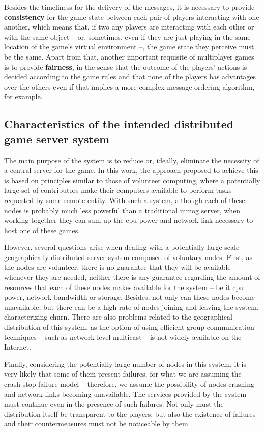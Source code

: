 \documentclass[]{usiinfprospectus}
\begin{document}
Besides the timeliness for the delivery of the messages, it is necessary to provide \textbf{consistency} for the game state between each pair of players interacting with one another, which means that, if two any players are interacting with each other or with the same object -- or, sometimes, even if they are just playing in the same location of the game's virtual environment --, the game state they perceive must be the same. Apart from that, another important requisite of multiplayer games is to provide \textbf{fairness}, in the sense that the outcome of the players' actions is decided according to the game rules and that none of the players has advantages over the others even if that implies a more complex message ordering algorithm, for example.


\subsection{Characteristics of the intended distributed game server system} \label{sec:feats}

The main purpose of the system is to reduce or, ideally, eliminate the necessity of a central server for the game. In this work, the approach proposed to achieve this is based on principles similar to those of volunteer computing, where a potentially large set of contributors make their computers available to perform tasks requested by some remote entity. With such a system, although each of these nodes is probably much less powerful than a traditional mmog server, when working together they can sum up the cpu power and network link necessary to host one of these games.

However, several questions arise when dealing with a potentially large scale geographically distributed server system composed of voluntary nodes. First, as the nodes are volunteer, there is no guarantee that they will be available whenever they are needed, neither there is any guarantee regarding the amount of resources that each of these nodes makes available for the system -- be it cpu power, network bandwidth or storage. Besides, not only can these nodes become unavailable, but there can be a high rate of nodes joining and leaving the system, characterizing churn. There are also problems related to the geographical distribution of this system, as the option of using efficient group communication techniques -- such as network level multicast -- is not widely available on the Internet.

Finally, considering the potentially large number of nodes in this system, it is very likely that some of them present failures, for what we are assuming the crash-stop failure model -- therefore, we assume the possibility of nodes crashing and network links becoming unavailable. The services provided by the system must continue even in the presence of such failures. Not only must the distribution itself be transparent to the players, but also the existence of failures and their countermeasures must not be noticeable by them.
\end{document}
